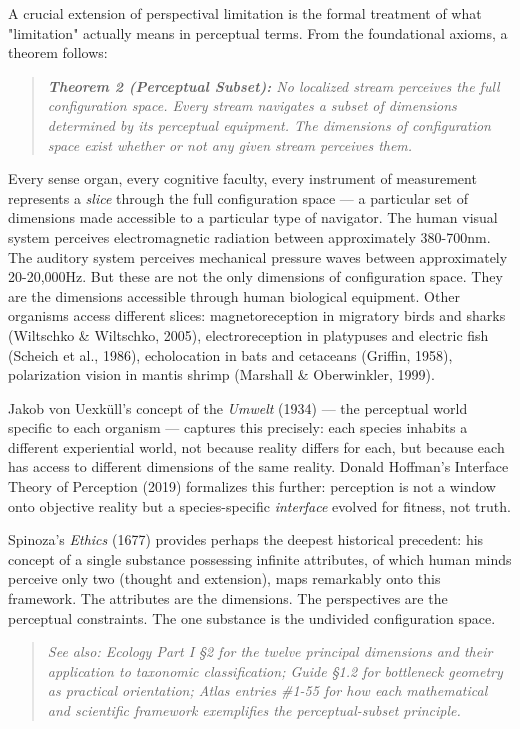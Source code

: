 A crucial extension of perspectival limitation is the formal treatment of what "limitation" actually means in perceptual terms. From the foundational axioms, a theorem follows:


\begin{quote}
\itshape
\textbf{Theorem 2 (Perceptual Subset):} \textit{No localized stream perceives the full configuration space. Every stream navigates a subset of dimensions determined by its perceptual equipment. The dimensions of configuration space exist whether or not any given stream perceives them.}
\end{quote}


Every sense organ, every cognitive faculty, every instrument of measurement represents a \textit{slice} through the full configuration space — a particular set of dimensions made accessible to a particular type of navigator. The human visual system perceives electromagnetic radiation between approximately 380-700nm. The auditory system perceives mechanical pressure waves between approximately 20-20,000Hz. But these are not the only dimensions of configuration space. They are the dimensions accessible through human biological equipment. Other organisms access different slices: magnetoreception in migratory birds and sharks (Wiltschko \& Wiltschko, 2005), electroreception in platypuses and electric fish (Scheich et al., 1986), echolocation in bats and cetaceans (Griffin, 1958), polarization vision in mantis shrimp (Marshall \& Oberwinkler, 1999).


Jakob von Uexküll's concept of the \textit{Umwelt} (1934) — the perceptual world specific to each organism — captures this precisely: each species inhabits a different experiential world, not because reality differs for each, but because each has access to different dimensions of the same reality. Donald Hoffman's Interface Theory of Perception (2019) formalizes this further: perception is not a window onto objective reality but a species-specific \textit{interface} evolved for fitness, not truth.


Spinoza's \textit{Ethics} (1677) provides perhaps the deepest historical precedent: his concept of a single substance possessing infinite attributes, of which human minds perceive only two (thought and extension), maps remarkably onto this framework. The attributes are the dimensions. The perspectives are the perceptual constraints. The one substance is the undivided configuration space.


\begin{quote}
\itshape
\textit{See also: Ecology Part I §2 for the twelve principal dimensions and their application to taxonomic classification; Guide §1.2 for bottleneck geometry as practical orientation; Atlas entries \#1-55 for how each mathematical and scientific framework exemplifies the perceptual-subset principle.}
\end{quote}


